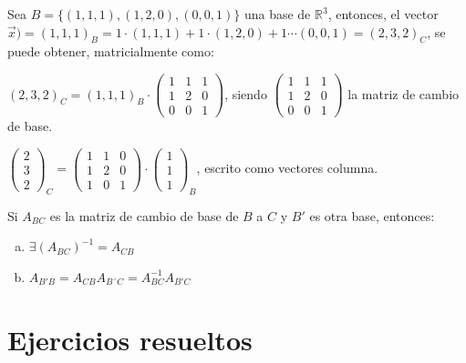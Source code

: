 \begin{cuadro-gris}
Sea $B=\{(1,1,1),(1,2,0),(0,0,1)\}$ una base de 	$\mathbb R^3$, entonces, el vector $\vec x)=(1,1,1)_B=1\cdot (1,1,1)+1\cdot (1,2,0)+ 1 \cdots(0,0,1)=(2,3,2)_C$, se puede obtener, matricialmente como:

$(2,3,2)_C= (1,1,1)_B \cdot \left( \begin{matrix} 1&1&1\\1&2&0\\0&0&1 \end{matrix} \right)$, siendo \scriptsize{$\left( \begin{matrix} 1&1&1\\1&2&0\\0&0&1 \end{matrix} \right)$} \normalsize{la} matriz de cambio de base.

\textcolor{gris}{$\left( \begin{matrix} 2\\3\\2 \end{matrix} \right)_C = 
\left( \begin{matrix} 1&1&0\\1&2&0\\1&0&1 \end{matrix} \right) \cdot 
\left( \begin{matrix} 1\\1\\1 \end{matrix} \right)_B$, escrito como vectores columna.}
\end{cuadro-gris}

\begin{theorem}

Si $A_{BC}$ es la matriz de cambio de base de $B$ a $C$ y $B'$ es otra base, entonces:

\begin{enumerate}[a) ]	
\item $\exists {(A_{BC})}^{-1}=A_{CB}$
\item $A_{B'B}=A_{CB}A_{B´C}=A^{-1}_{BC}A_{B'C}$	
\end{enumerate}

\end{theorem}


\section{Ejercicios resueltos}
\vspace{0.5cm}

